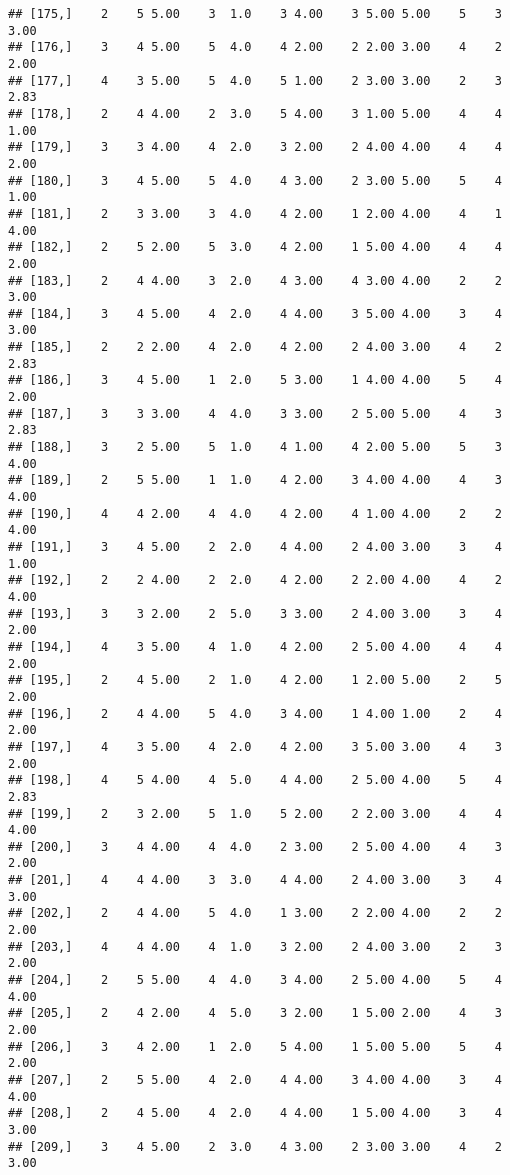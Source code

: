 \documentclass[]{article}
\begin{document}
\begin{verbatim}
## [175,]    2    5 5.00    3  1.0    3 4.00    3 5.00 5.00    5    3 3.00
## [176,]    3    4 5.00    5  4.0    4 2.00    2 2.00 3.00    4    2 2.00
## [177,]    4    3 5.00    5  4.0    5 1.00    2 3.00 3.00    2    3 2.83
## [178,]    2    4 4.00    2  3.0    5 4.00    3 1.00 5.00    4    4 1.00
## [179,]    3    3 4.00    4  2.0    3 2.00    2 4.00 4.00    4    4 2.00
## [180,]    3    4 5.00    5  4.0    4 3.00    2 3.00 5.00    5    4 1.00
## [181,]    2    3 3.00    3  4.0    4 2.00    1 2.00 4.00    4    1 4.00
## [182,]    2    5 2.00    5  3.0    4 2.00    1 5.00 4.00    4    4 2.00
## [183,]    2    4 4.00    3  2.0    4 3.00    4 3.00 4.00    2    2 3.00
## [184,]    3    4 5.00    4  2.0    4 4.00    3 5.00 4.00    3    4 3.00
## [185,]    2    2 2.00    4  2.0    4 2.00    2 4.00 3.00    4    2 2.83
## [186,]    3    4 5.00    1  2.0    5 3.00    1 4.00 4.00    5    4 2.00
## [187,]    3    3 3.00    4  4.0    3 3.00    2 5.00 5.00    4    3 2.83
## [188,]    3    2 5.00    5  1.0    4 1.00    4 2.00 5.00    5    3 4.00
## [189,]    2    5 5.00    1  1.0    4 2.00    3 4.00 4.00    4    3 4.00
## [190,]    4    4 2.00    4  4.0    4 2.00    4 1.00 4.00    2    2 4.00
## [191,]    3    4 5.00    2  2.0    4 4.00    2 4.00 3.00    3    4 1.00
## [192,]    2    2 4.00    2  2.0    4 2.00    2 2.00 4.00    4    2 4.00
## [193,]    3    3 2.00    2  5.0    3 3.00    2 4.00 3.00    3    4 2.00
## [194,]    4    3 5.00    4  1.0    4 2.00    2 5.00 4.00    4    4 2.00
## [195,]    2    4 5.00    2  1.0    4 2.00    1 2.00 5.00    2    5 2.00
## [196,]    2    4 4.00    5  4.0    3 4.00    1 4.00 1.00    2    4 2.00
## [197,]    4    3 5.00    4  2.0    4 2.00    3 5.00 3.00    4    3 2.00
## [198,]    4    5 4.00    4  5.0    4 4.00    2 5.00 4.00    5    4 2.83
## [199,]    2    3 2.00    5  1.0    5 2.00    2 2.00 3.00    4    4 4.00
## [200,]    3    4 4.00    4  4.0    2 3.00    2 5.00 4.00    4    3 2.00
## [201,]    4    4 4.00    3  3.0    4 4.00    2 4.00 3.00    3    4 3.00
## [202,]    2    4 4.00    5  4.0    1 3.00    2 2.00 4.00    2    2 2.00
## [203,]    4    4 4.00    4  1.0    3 2.00    2 4.00 3.00    2    3 2.00
## [204,]    2    5 5.00    4  4.0    3 4.00    2 5.00 4.00    5    4 4.00
## [205,]    2    4 2.00    4  5.0    3 2.00    1 5.00 2.00    4    3 2.00
## [206,]    3    4 2.00    1  2.0    5 4.00    1 5.00 5.00    5    4 2.00
## [207,]    2    5 5.00    4  2.0    4 4.00    3 4.00 4.00    3    4 4.00
## [208,]    2    4 5.00    4  2.0    4 4.00    1 5.00 4.00    3    4 3.00
## [209,]    3    4 5.00    2  3.0    4 3.00    2 3.00 3.00    4    2 3.00

\end{verbatim}
\end{document}
